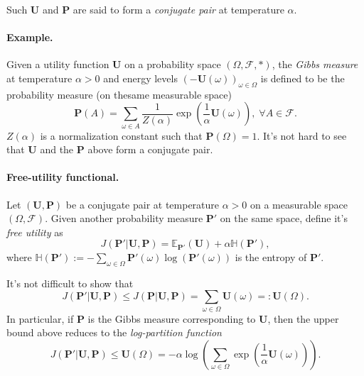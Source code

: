 \documentclass{article} %
\def\U{\mathbf{U}}
\def\P{\mathbf{P}}
\begin{document}
Such $\U$ and $\P$ are said to form a \textit{conjugate pair} at temperature $\alpha$.


\paragraph{Example.}
Given a utility function $\U$ on a probability space $(\Omega, \mathcal F, *)$, the \textit{Gibbs measure} at temperature $\alpha > 0$ and energy levels $(-\U(\omega))_{\omega \in \Omega}$ is defined to be the probability measure (on thesame measurable space)
  \begin{equation}
    \P(A) = \sum_{\omega \in A}\frac{1}{Z(\alpha)}\exp\left(\frac{1}{\alpha}\U(\omega)\right), \; \forall A \in \mathcal F.
  \end{equation}
$Z(\alpha)$ is a normalization constant such that $\P(\Omega) = 1$.  It's not hard to see that $\U$ and the $\P$ above form a conjugate pair.

  \paragraph{Free-utility functional.}
    Let $(\U, \P)$ be a conjugate pair at temperature $\alpha > 0$  on a measurable space $(\Omega, \mathcal F)$. Given another probability measure $\P'$ on the same space, define it's \textit{free utility} as
    \begin{equation}
      J(\P'|\U, \P) = \mathbb E_{\P'}(\U) + \alpha \mathbb H(\P'),
    \label{eq:free_u}
    \end{equation}
    where $\mathbb H(\P') := -\sum_{\omega \in \Omega}\P'(\omega)\log(\P'(\omega))$ is the entropy of $\P'$.

  It's not difficult to show that
  \begin{equation}
    J(\P'|\U,\P) \le J(\P|\U,\P) = \sum_{\omega \in \Omega}\U(\omega) =: \U(\Omega).
  \end{equation}
  In particular, if $\P$ is the Gibbs measure corresponding to $\U$, then the upper bound above reduces to the \textit{log-partition function}
  \begin{equation}
    J(\P'|\U,\P) \le \U(\Omega) = -\alpha \log\left(\sum_{\omega \in \Omega}\exp\left(\frac{1}{\alpha}\U(\omega)\right)\right).
    \end{equation}
\end{document}
